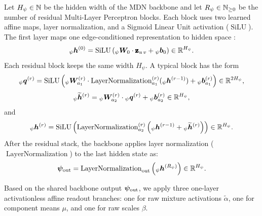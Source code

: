 Let $H_{\psi}\in\mathbb{N}$ be the hidden width of the MDN backbone and let
$R_{\psi}\in\mathbb{N}_{\ge 0}$ be the number of residual Multi-Layer Perceptron blocks.
Each block uses two learned affine maps, layer normalization, and a Sigmoid
Linear Unit activation ($\operatorname{SiLU}$).
The first layer maps one edge-conditioned representation to hidden space%
:
\[
  {}_{\psi}\bm{h}^{(0)}
  =
  \operatorname{SiLU}
  \left(
    {}_{\psi}\bm{W}_{0}\cdot\pmb{\mathbf{z}}_{u\,v}
    +
    {}_{\psi}\bm{b}_{0}
  \right)
  \in \mathbb{R}^{H_{\psi}}.
\]
Each residual block keeps the same width $H_{\psi}$.
A typical block has the form
\[
  {}_{\psi}\bm{q}^{(r)}
  =
  \operatorname{SiLU}
  \left(
    {}_{\psi}\bm{W}^{(r)}_{a_1}\cdot
    \operatorname{LayerNormalization}^{(r)}_{a_1}({}_{\psi}\bm{h}^{(r-1)})
    +
    {}_{\psi}\bm{b}^{(r)}_{a_1}
  \right)
  \in \mathbb{R}^{2H_{\psi}},
\]
\[
  {}_{\psi}\widetilde{\bm{h}}^{(r)}
  =
  {}_{\psi}\bm{W}^{(r)}_{a_2}\cdot{}_{\psi}\bm{q}^{(r)}
  +
  {}_{\psi}\bm{b}^{(r)}_{a_2}
  \in \mathbb{R}^{H_{\psi}},
\]
and
\[
  {}_{\psi}\bm{h}^{(r)}
  =
  \operatorname{SiLU}
  \left(
    \operatorname{LayerNormalization}^{(r)}_{a_2}
    \left(
      {}_{\psi}\bm{h}^{(r-1)}
      +
      {}_{\psi}\widetilde{\bm{h}}^{(r)}
    \right)
  \right)
  \in \mathbb{R}^{H_{\psi}}.
\]
After the residual stack, the backbone applies layer normalization ($\operatorname{LayerNormalization}$)%
 to the last hidden state as:
\[
  \bm{\psi}_{\mathrm{out}}
  =
  \operatorname{LayerNormalization}_{\mathrm{out}}
  \left(
    {}_{\psi}\bm{h}^{(R_{\psi})}
  \right)
  \in \mathbb{R}^{H_{\psi}}.
\]

Based on the shared backbone output $\bm{\psi}_{\mathrm{out}}$, we apply three
one-layer activationless affine readout branches: one for raw
mixture activations $\tilde{\alpha}$, one for component means $\mu$, and one
for raw scales $\beta$.%

